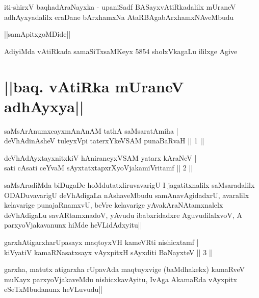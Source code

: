 \begin{center}
iti-shirxV baqhadAraNayxka - upaniSadf BASayxvAtiRkadalilx mUraneV adhAyxyadalilx eraDane bArxhamxNa AtaRBAgabArxhamxNAveMbudu
\end{center}

\begin{center}
||samApitxgoMDide||
\end{center}

\begin{center}
AdiyiMda vAtiRkada samaSiTxsaMKeyx 5854 sholxVkagaLu ililxge Agive
\end{center}

\section*{||baq. vAtiRka mUraneV adhAyxya||}


\begin{shl}
saMsArAnumxcayxmAnAnAM tathA saMsaratAmiha |\\
deVhAdinAsheV tuleyxV\s pi taterxYkeVSAM punaBaRvaH \hfill || 1 ||
\end{shl}

\begin{shl}
deVhAdAyxtayxnitxkiV hAniraneyxVSAM yatarx kAraNeV |\\
sati cAsati ceYvaM sAyxtatxtapxrXyoVjakamiVritamf \hfill || 2 ||
\end{shl}

\begin{artha}
saMsAradiMda biDugaDe hoMdutatxliruvavarigU I jagatitxnalilx saMsaradalilx ODADuvavarigU deVhAdigaLa nAshaveMbudu samAnavAgidadxrU, avaralilx kelavarige punajaRnamxvU, beVre kelavarige yAvakAraNAtamxnalelx deVhAdigaLu savARtamxnadoV, yAvudu ibabxridadxre AguvudilalxvoV, A parxyoVjakavanunx hiMde heVLidAdxyitu||
\end{artha}


\begin{shl}
garxhAtigarxharUpasayx maqtoyxVH kameVRti nishicxtamf |\\
kiVyatiV kamaRNasatxsayx vAyxpitxH sAyxditi BaNayxteV \hfill || 3 ||
\end{shl}

\begin{artha}
garxha, matutx atigarxha rUpavAda maqtuyxvige (baMdhakekx) kamaRveV muKayx parxyoVjakaveMdu nishicxkavAyitu, IvAga AkamaRda vAyxpitx eSeTxMbudanunx heVLuvudu||
\end{artha}

